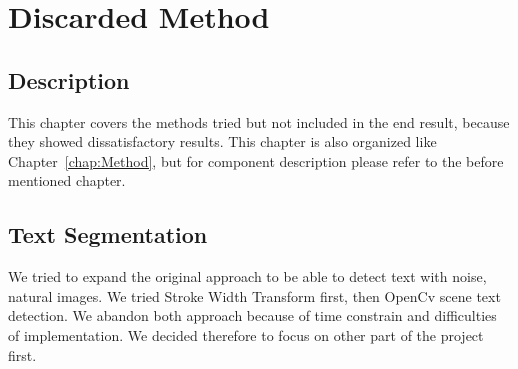 \documentclass[Report.tex]{subfiles}
\begin{document}
\chapter{Discarded Method}
\label{chap:Discarded Method}
\section{Description}
This chapter covers the methods tried but not included in the end result,
because they showed dissatisfactory results. This chapter is also organized
like Chapter~\ref{chap:Method}, but for component description please refer to 
the before mentioned chapter.

\section{Text Segmentation}
We tried to expand the original approach to be able to detect text with noise, natural images. We tried Stroke Width Transform first, then OpenCv scene text detection. We abandon both approach because of time constrain and difficulties of implementation. We decided therefore to focus on other part of the project first. 
\end{document}
